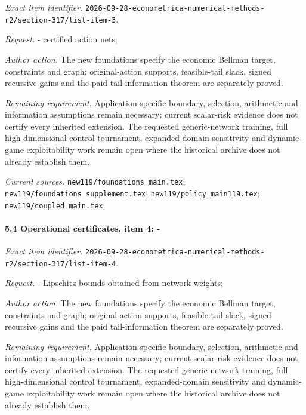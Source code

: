 \emph{Exact item identifier.} \nolinkurl{2026-09-28-econometrica-numerical-methods-r2/section-317/list-item-3}.

\par\emph{Request.} - certified action nets;

\par\emph{Author action.} The new foundations specify the economic Bellman target, constraints and graph; original-action supports, feasible-tail slack, signed recursive gains and the paid tail-information theorem are separately proved.

\par\emph{Remaining requirement.} Application-specific boundary, selection, arithmetic and information assumptions remain necessary; current scalar-risk evidence does not certify every inherited extension. The requested generic-network training, full high-dimensional control tournament, expanded-domain sensitivity and dynamic-game exploitability work remain open where the historical archive does not already establish them.

\par\emph{Current sources.} \nolinkurl{new119/foundations_main.tex}; \nolinkurl{new119/foundations_supplement.tex}; \nolinkurl{new119/policy_main119.tex}; \nolinkurl{new119/coupled_main.tex}.

\paragraph{5.4 Operational certificates, item 4: -}

\emph{Exact item identifier.} \nolinkurl{2026-09-28-econometrica-numerical-methods-r2/section-317/list-item-4}.

\par\emph{Request.} - Lipschitz bounds obtained from network weights;

\par\emph{Author action.} The new foundations specify the economic Bellman target, constraints and graph; original-action supports, feasible-tail slack, signed recursive gains and the paid tail-information theorem are separately proved.

\par\emph{Remaining requirement.} Application-specific boundary, selection, arithmetic and information assumptions remain necessary; current scalar-risk evidence does not certify every inherited extension. The requested generic-network training, full high-dimensional control tournament, expanded-domain sensitivity and dynamic-game exploitability work remain open where the historical archive does not already establish them.

